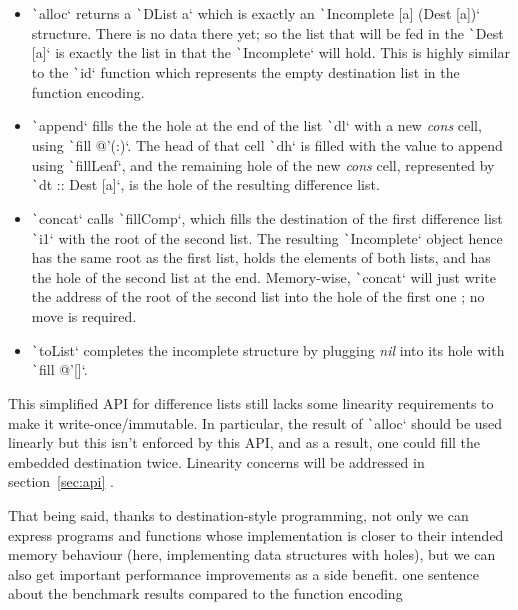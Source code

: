 \documentclass[english]{jflart}
\newcommand{\TODO}[1]{{\color{red}\large #1}}
\begin{document}
\begin{itemize}
  \item \texttt`alloc` returns a \texttt`DList a` which is exactly an \texttt`Incomplete [a] (Dest [a])` structure. There is no data there yet; so the list that will be fed in the \texttt`Dest [a]` is exactly the list in that the \texttt`Incomplete` will hold. This is highly similar to the \texttt`id` function which represents the empty destination list in the function encoding.
  \item \texttt`append` fills the the hole at the end of the list \texttt`dl` with a new \emph{cons} cell, using \texttt`fill @'(:)`. The head of that cell \texttt`dh` is filled with the value to append using \texttt`fillLeaf`, and the remaining hole of the new \emph{cons} cell, represented by \texttt`dt :: Dest [a]`, is the hole of the resulting difference list.
  \item \texttt`concat` calls \texttt`fillComp`, which fills the destination of the first difference list \texttt`i1` with the root of the second list. The resulting \texttt`Incomplete` object hence has the same root as the first list, holds the elements of both lists, and has the hole of the second list at the end. Memory-wise, \texttt`concat` will just write the address of the root of the second list into the hole of the first one ; no move is required.
  \item \texttt`toList` completes the incomplete structure by plugging \emph{nil} into its hole with \texttt`fill @'[]`.
\end{itemize}

This simplified API for difference lists still lacks some linearity requirements to make it write-once/immutable. In particular, the result of \texttt`alloc` should be used linearly but this isn't enforced by this API, and as a result, one could fill the embedded destination twice. Linearity concerns will be addressed in section~\ref{sec:api} .

That being said, thanks to destination-style programming, not only we can express programs and functions whose implementation is closer to their intended memory behaviour (here, implementing data structures with holes), but we can also get important performance improvements as a side benefit. \TODO{one sentence about the benchmark results compared to the function encoding}
\end{document}
